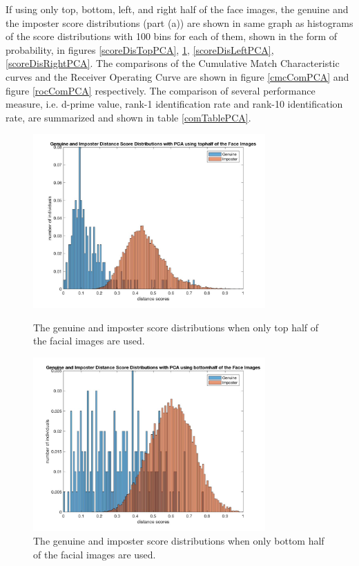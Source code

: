 \documentclass[a4paper]{article}
\begin{document}
\begin{spacing}{2.0}
	If using only top, bottom, left, and right half of the face images, the genuine and the imposter score distributions (part (a)) are shown in same graph as histograms of the score distributions with 100 bins for each of them, shown in the form of probability, in figures \ref{scoreDisTopPCA}, \ref{scoreDisBottomPCA}, \ref{scoreDisLeftPCA}, \ref{scoreDisRightPCA}. The comparisons of the Cumulative Match Characteristic curves and the Receiver Operating Curve are shown in figure \ref{cmcComPCA} and figure \ref{rocComPCA} respectively. The comparison of several performance measure, i.e. d-prime value, rank-1 identification rate and rank-10 identification rate, are summarized and shown in table \ref{comTablePCA}.
	
	\begin{figure}[h!]
	\begin{minipage}[t]{0.5\linewidth}
	\centering
	\includegraphics[width = 3.5in]{pcatopscoreDis.jpg}
	\caption{The genuine and imposter score distributions when only top half of the facial images are used.}
	\label{scoreDisTopPCA}
	\end{minipage}
	\begin{minipage}[t]{0.5\linewidth}
	\centering
	\includegraphics[width = 3.5in]{pcabottomscoreDis.jpg}
	\caption{The genuine and imposter score distributions when only bottom half of the facial images are used.}
	\label{scoreDisBottomPCA}
	\end{minipage}
	\end{figure}	
	

\end{spacing}
\end{document}
